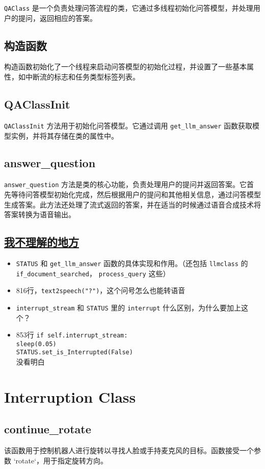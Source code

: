 \documentclass[]{article}
\begin{document}
	\texttt{QAClass} 是一个负责处理问答流程的类，它通过多线程初始化问答模型，并处理用户的提问，返回相应的答案。
	
	\subsection{构造函数}
	构造函数初始化了一个线程来启动问答模型的初始化过程，并设置了一些基本属性，如中断流的标志和任务类型标签列表。
	
	\subsection{QAClassInit}
	\texttt{QAClassInit} 方法用于初始化问答模型。它通过调用 \texttt{get\_llm\_answer} 函数获取模型实例，并将其存储在类的属性中。
	
	\subsection{answer\_question}
	\texttt{answer\_question} 方法是类的核心功能，负责处理用户的提问并返回答案。它首先等待问答模型初始化完成，然后根据用户的提问和其他相关信息，通过问答模型生成答案。此方法还处理了流式返回的答案，并在适当的时候通过语音合成技术将答案转换为语音输出。
	
	\subsection{\underline{我不理解的地方}}
\begin{itemize}
	\item \texttt{STATUS} 和 \texttt{get\_llm\_answer} 函数的具体实现和作用。（还包括 \texttt{llmclass} 的 \texttt{if\_document\_searched}， \texttt{process\_query} 这些）
	\item 816行，\texttt{text2speech("?")}，这个问号怎么也能转语音
	\item \texttt{interrupt\_stream} 和 \texttt{STATUS} 里的 \texttt{interrupt} 什么区别，为什么要加上这个？
	\item 853行 \texttt{if self.interrupt\_stream:}\\
	\texttt{sleep(0.05)}\\
	\texttt{STATUS.set\_is\_Interrupted(False)}\\
	没看明白
\end{itemize}
\section{Interruption Class}
\subsection{continue\_rotate}
该函数用于控制机器人进行旋转以寻找人脸或手持麦克风的目标。函数接受一个参数 `rotate`，用于指定旋转方向。
\end{document}
